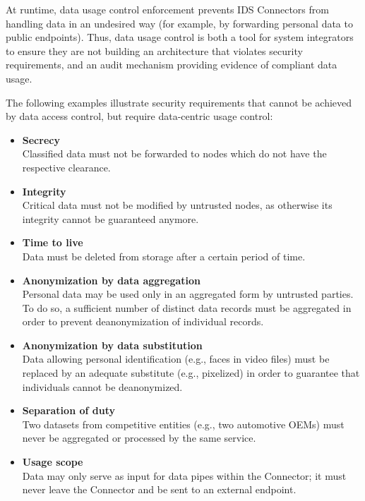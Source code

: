 At runtime, data usage control enforcement prevents IDS Connectors from handling data in an undesired way (for example, by forwarding personal data to public endpoints). Thus, data usage control is both a tool for system integrators to ensure they are not building an architecture that violates security requirements, and an audit mechanism providing evidence of compliant data usage.

The following examples illustrate security requirements that cannot be achieved by data access control, but require data-centric usage control:

\begin{itemize}
	\item \textbf{\textcolor[HTML]{4F81BD}{Secrecy}}\\
Classified data must not be forwarded to nodes which do not have the respective clearance.

	\item \textbf{\textcolor[HTML]{4F81BD}{Integrity}}\\
Critical data must not be modified by untrusted nodes, as otherwise its integrity cannot be guaranteed anymore.

	\item \textbf{\textcolor[HTML]{4F81BD}{Time to live\\
}}Data must be deleted from storage after a certain period of time.

	\item \textbf{\textcolor[HTML]{4F81BD}{Anonymization by data aggregation}}\\
Personal data may be used only in an aggregated form by untrusted parties. To do so, a sufficient number of distinct data records must be aggregated in order to prevent deanonymization of individual records.

	\item \textbf{\textcolor[HTML]{4F81BD}{Anonymization by data substitution}}\\
Data allowing personal identification (e.g., faces in video files) must be replaced by an adequate substitute (e.g., pixelized) in order to guarantee that individuals cannot be deanonymized.

	\item \textbf{\textcolor[HTML]{4F81BD}{Separation of duty}}\\
Two datasets from competitive entities (e.g., two automotive OEMs) must never be aggregated or processed by the same service.

	\item \textbf{\textcolor[HTML]{4F81BD}{Usage scope}}\\
Data may only serve as input for data pipes within the Connector; it must never leave the Connector and be sent to an external endpoint.
\end{itemize}


